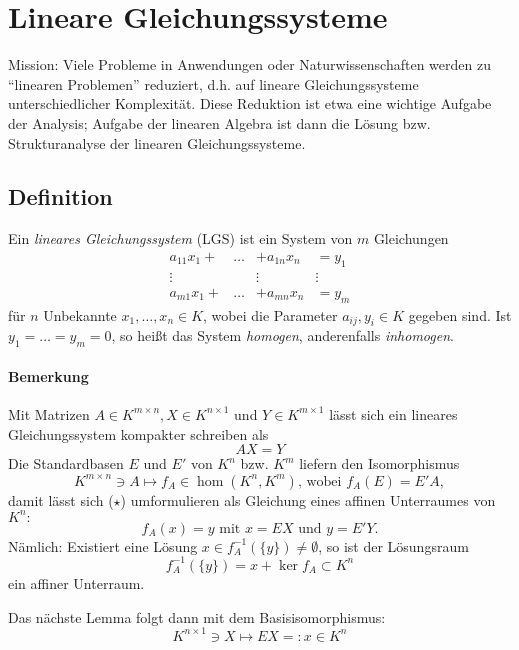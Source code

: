 \section{Lineare Gleichungssysteme}
 Mission: Viele Probleme in Anwendungen oder Naturwissenschaften werden zu "`linearen Problemen"' reduziert, d.h. auf lineare Gleichungssysteme unterschiedlicher Komplexität.
 Diese Reduktion ist etwa eine wichtige Aufgabe der Analysis; Aufgabe der linearen Algebra ist dann die Lösung bzw. Strukturanalyse der linearen Gleichungssysteme.
 \subsection{Definition}
 	\begin{Definition}
 		Ein \emph{lineares Gleichungssystem} (LGS) ist ein System von $ m $ Gleichungen
 		\[
 			\begin{array}{cccc}\tag{$\star\star$}
 				a_{11}x_1+  & \dots & + a_{1n}x_n & =y_1   \\
 				\vdots      &       & \vdots      & \vdots \\
 				a_{m1}x_1 + & \dots & +a_{mn}x_n  & = y_m
 			\end{array}
 		\]
 		für $ n $ Unbekannte $ x_1,\dots,x_n\in K $, wobei die Parameter $ a_{ij},y_i\in K $ gegeben sind. Ist $ y_1 = \dots = y_m = 0 $, so heißt das System \emph{homogen}, anderenfalls \emph{inhomogen}.
 	\end{Definition}
 	\paragraph{Bemerkung}
 		Mit Matrizen $ A\in K^{m\times n},X\in K^{n\times 1} $ und $ Y\in K^{m\times 1} $ lässt sich ein lineares Gleichungssystem kompakter schreiben als
 		\[
 			AX = Y \tag{$\star$}
 		\]
 		Die Standardbasen $ E $ und $ E' $ von $ K^n $ bzw. $ K^m $ liefern den Isomorphismus
 		\[
 			K^{m\times n}\ni A\mapsto f_A\in \hom(K^n,K^m)\text{, wobei }f_A(E) = E'A,
 		\]
 		damit lässt sich ($\star$) umformulieren als Gleichung eines affinen Unterraumes von $ K^n: $
 		\[
 			f_A(x) = y \text{ mit } x=EX \text{ und } y=E'Y.
 		\]
 		Nämlich: Existiert eine Lösung $ x\in f_A^{-1}(\{y\})\neq \emptyset $, so ist der Lösungsraum
 		\[
 			f_A^{-1}(\{y\}) = x+\ker f_A\subset K^n
 		\]
 		ein affiner Unterraum.

 		Das nächste Lemma folgt dann mit dem Basisisomorphismus:
 		\[
 			K^{n\times 1} \ni X \mapsto EX =: x\in K^n
 		\]
